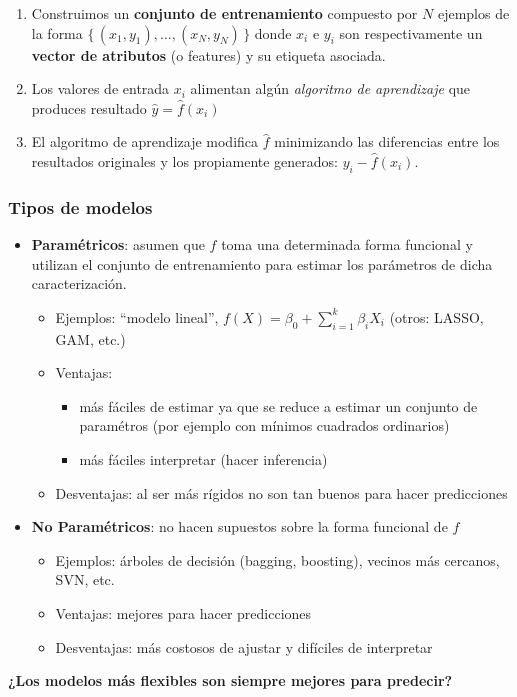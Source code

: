 \documentclass[leqno, 10pt, envcountsect]{beamer}
\numberwithin{equation}{section}
\theoremstyle{definition}
\theoremstyle{example}
\numberwithin{figure}{section}
\numberwithin{table}{section}
\let\olditem\item
\renewcommand{\item}{%
\olditem\vspace{1pt}}
\begin{document}
\begin{frame}[fragile=singleslide]
\begin{itemize}
\begin{itemize}
\begin{enumerate}
            \item Construimos un \textbf{conjunto de entrenamiento} compuesto
              por $N$ ejemplos de la forma $\{\, (x_{1}, y_{1}), \ldots, (x_{N},
              y_{N}) \,\}$ donde $x_{i}$ e $y_{i}$ son respectivamente un
              \textbf{vector de atributos} (o features) y su etiqueta asociada.
            \item Los valores de entrada $x_{i}$ alimentan algún
              \textit{algoritmo de aprendizaje} que produces resultado $\hat{y}
              = \hat{f}(x_{i})$
            \item El algoritmo de aprendizaje modifica $\hat{f}$ minimizando las
              diferencias entre los resultados originales y los propiamente
              generados: $y_{i} - \hat{f}(x_{i})$.
          \end{enumerate}
      \end{itemize}
  \end{itemize}
\end{frame}
\begin{frame}[fragile=singleslide]
  \frametitle{Tipos de modelos}
  \begin{itemize}
    \item \textbf{Paramétricos}: asumen que $f$ toma una determinada forma
      funcional y utilizan el conjunto de entrenamiento para estimar los
      parámetros de dicha caracterización.
      \begin{itemize}
        \item Ejemplos: \enquote{modelo lineal},  $f(X) = \beta_{0} +
          \sum_{i=1}^{k}\beta_{i}{X}_{i}$ (otros: LASSO, GAM, etc.)
        \item Ventajas:
      \begin{itemize}
        \item más fáciles de estimar ya que se reduce a estimar un
          conjunto de paramétros (por ejemplo con mínimos cuadrados ordinarios)
        \item más fáciles interpretar (hacer inferencia)
      \end{itemize}
        \item Desventajas: al ser más rígidos no son tan buenos para hacer
          predicciones
      \end{itemize}
    \item \textbf{No Paramétricos}: no hacen supuestos sobre la forma funcional de $f$
      \begin{itemize}
        \item Ejemplos: árboles de decisión (bagging, boosting), vecinos más
          cercanos, SVN, etc.
        \item Ventajas: mejores para hacer predicciones
        \item Desventajas: más costosos de ajustar y difíciles de interpretar
      \end{itemize}
  \end{itemize}

  \textbf{¿Los modelos más flexibles son siempre mejores para predecir?}
\end{frame}
\end{document}

